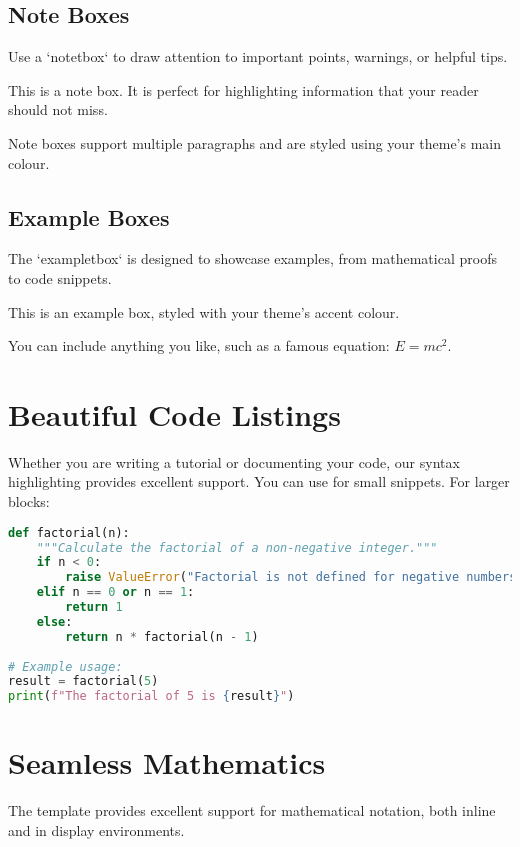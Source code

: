 \documentclass[a4paper,11pt]{report}
\begin{document}
\subsection{Note Boxes}
Use a `notetbox` to draw attention to important points, warnings, or helpful tips.

\begin{notetbox}
    This is a note box. It is perfect for highlighting information that your reader should not miss.
    
    Note boxes support multiple paragraphs and are styled using your theme's main colour.
\end{notetbox}

\subsection{Example Boxes}
The `exampletbox` is designed to showcase examples, from mathematical proofs to code snippets.

\begin{exampletbox}
    This is an example box, styled with your theme's accent colour.
    
    You can include anything you like, such as a famous equation: $E = mc^2$.
\end{exampletbox}

\section{Beautiful Code Listings}
Whether you are writing a tutorial or documenting your code, our syntax highlighting provides excellent support. You can use  for small snippets. For larger blocks:

\begin{lstlisting}[language=Python, caption={A simple Python function}, label={lst:factorial}]
def factorial(n):
    """Calculate the factorial of a non-negative integer."""
    if n < 0:
        raise ValueError("Factorial is not defined for negative numbers")
    elif n == 0 or n == 1:
        return 1
    else:
        return n * factorial(n - 1)
        
# Example usage:
result = factorial(5)
print(f"The factorial of 5 is {result}")
\end{lstlisting}

\section{Seamless Mathematics}
The template provides excellent support for mathematical notation, both inline and in display environments.
\end{document}
